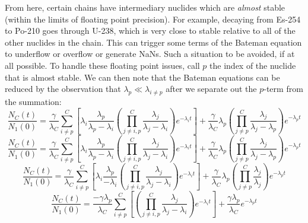 \documentclass[letterpaper]{physor2018}
\begin{document}
From here, certain chains have intermediary nuclides which are \emph{almost} stable
(within the limits of floating point precision). For example, decaying
from Es-254 to Po-210 goes through U-238, which is very close to stable relative to all of the
other nuclides in the chain. This can trigger some terms of the Bateman equation to
underflow or overflow or generate NaNs. Such a situation to be avoided,
if at all possible. To handle these floating point issues, call $p$ the index of the nuclide
that is almost stable. We can then note that the Bateman equations can be reduced by the
observation that $\lambda_p \ll \lambda_{i\ne p}$ after we separate out the $p$-term
from the summation:
\begin{equation}
\label{almost-stable-0}
\frac{N_C(t)}{N_1(0)} = \frac{\gamma}{\lambda_C}\sum_{i\ne p}^C \left[\lambda_i \frac{\lambda_p}{\lambda_p - \lambda_i}
                                                    \left(\prod_{j\ne i,p}^C \frac{\lambda_j}{\lambda_j - \lambda_i}\right)
                                                    e^{-\lambda_i t}\right]
                       + \frac{\gamma}{\lambda_C} \lambda_p \left(\prod_{j\ne p}^C \frac{\lambda_j}{\lambda_j - \lambda_p} \right) e^{-\lambda_p t}
\end{equation}
\begin{equation}
\label{almost-stable-1}
\frac{N_C(t)}{N_1(0)} = \frac{\gamma}{\lambda_C}\sum_{i\ne p}^C \left[\lambda_i \frac{\lambda_p}{\lambda_p - \lambda_i}
                                                    \left(\prod_{j\ne i,p}^C \frac{\lambda_j}{\lambda_j - \lambda_i}\right)
                                                    e^{-\lambda_i t}\right]
                       + \frac{\gamma}{\lambda_C} \lambda_p \left(\prod_{j\ne p}^C \frac{\lambda_j}{\lambda_j - \lambda_p}\right) e^{-\lambda_p t}
\end{equation}
\begin{equation}
\label{almost-stable-2}
   \frac{N_C(t)}{N_1(0)} = \frac{\gamma}{\lambda_C}\sum_{i\ne p}^C \left[\lambda_i \frac{\lambda_p}{- \lambda_i}
                                                        \left(\prod_{j\ne i,p}^C \frac{\lambda_j}{\lambda_j - \lambda_i}\right)
                                                        e^{-\lambda_i t}\right]
                           + \frac{\gamma}{\lambda_C} \lambda_p \left(\prod_{j\ne p}^C \frac{\lambda_j}{\lambda_j}\right) e^{-\lambda_p t}
\end{equation}
\begin{equation}
\label{almost-stable-3}
   \frac{N_C(t)}{N_1(0)} = \frac{-\gamma\lambda_p}{\lambda_C}\sum_{i\ne p}^C \left[
                                                        \left(\prod_{j\ne i,p}^C \frac{\lambda_j}{\lambda_j - \lambda_i}\right)
                                                        e^{-\lambda_i t}\right]
                           + \frac{\gamma\lambda_p}{\lambda_C} e^{-\lambda_p t}
\end{equation}
\end{document}
